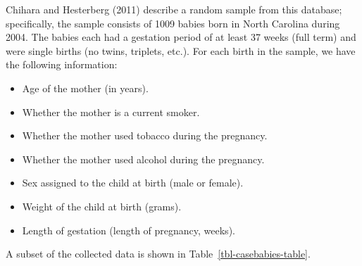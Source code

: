 \documentclass[
  letterpaper,
  DIV=11,
  numbers=noendperiod]{scrreprt}
\providecommand{\tightlist}{%
  \setlength{\itemsep}{0pt}\setlength{\parskip}{0pt}}\usepackage{longtable,booktabs,array}
\theoremstyle{plain}
\theoremstyle{definition}
\theoremstyle{definition}
\theoremstyle{remark}
\begin{document}
Chihara and Hesterberg (2011) describe a random sample from this
database; specifically, the sample consists of 1009 babies born in North
Carolina during 2004. The babies each had a gestation period of at least
37 weeks (full term) and were single births (no twins, triplets, etc.).
For each birth in the sample, we have the following information:

\begin{itemize}
\tightlist
\item
  Age of the mother (in years).
\item
  Whether the mother is a current smoker.
\item
  Whether the mother used tobacco during the pregnancy.
\item
  Whether the mother used alcohol during the pregnancy.
\item
  Sex assigned to the child at birth (male or female).
\item
  Weight of the child at birth (grams).
\item
  Length of gestation (length of pregnancy, weeks).
\end{itemize}

A subset of the collected data is shown in
Table~\ref{tbl-casebabies-table}.
\end{document}
